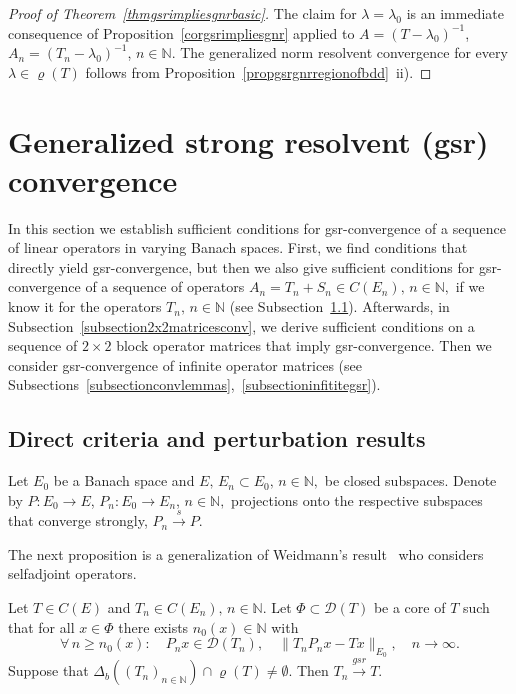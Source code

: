 \documentclass[a4paper,reqno]{amsart}
\begin{document}
{\begin{proof}[Proof of Theorem~{\rm\ref{thmgsrimpliesgnrbasic}}]
The claim for $\lambda=\lambda_0$ is an immediate consequence of Proposition~\ref{corgsrimpliesgnr} applied to
$A=(T-\lambda_0)^{-1}$, $A_n=(T_n-\lambda_0)^{-1}$, $n\in{\mathbb{N}}.$
The generalized norm resolvent convergence for every $\lambda\in\varrho(T)$ follows from  Proposition~\ref{propgsrgnrregionofbdd}~ii).
\end{proof}

\section{Generalized strong resolvent (gsr) convergence}\label{sectionsuffcondforstrongresconv}
In this section we establish sufficient conditions for gsr-convergence of a sequence of linear operators in varying Banach spaces.
First, we find conditions that directly yield gsr-convergence,
but then we also give sufficient conditions for gsr-convergence of a sequence of operators $A_n=T_n+S_n\in C(E_n),\,n\in{\mathbb{N}},$ if we know it for the operators $T_n,\,n\in{\mathbb{N}}$ (see Subsection~\ref{subsectiondirectgsr}).
Afterwards, in Subsection~\ref{subsection2x2matricesconv}, we derive sufficient conditions on a sequence of $2\times 2$ block operator matrices that imply gsr-convergence.
Then we consider gsr-convergence of infinite operator matrices (see Subsections~\ref{subsectionconvlemmas},~\ref{subsectioninfititegsr}).

\subsection{Direct criteria and perturbation results}\label{subsectiondirectgsr}
Let $E_0$ be a Banach space and $E, \,E_n\subset E_0, \,n\in{\mathbb{N}},$ be closed subspaces. Denote by 
$P:E_0\to E$, $P_n:E_0\to E_n$, $n\in{\mathbb{N}},$ projections onto the respective subspaces that converge strongly, $P_n{\stackrel{s}{\rightarrow}} P$.

The next proposition is 
a generalization of Weidmann's result~\cite[Satz~9.29~a)]{weid1} who considers selfadjoint operators.
\begin{theorem} \label{propcoreforgsr}
Let $T\in C(E)$ and  $T_n\in C(E_n), \,n\in{\mathbb{N}}$.
 Let $\Phi\subset{\mathcal D}(T)$ be a core of $T$ such that 
for all $x\in\Phi$ there exists $n_0(x)\in{\mathbb{N}}$ with 
$$\forall\,n\geq n_0(x):\quad P_nx\in{\mathcal D}(T_n), \quad \|T_nP_nx- Tx\|_{E_0}, \quad n\to\infty.$$ 
Suppose that $\Delta_b\left((T_n)_{n\in{\mathbb{N}}}\right)\cap\varrho(T)\neq\emptyset$. Then $T_n{\stackrel{gsr}{\rightarrow}} T$.
\end{theorem}

}
\end{document}
